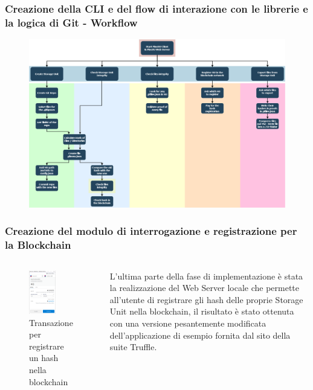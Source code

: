 \documentclass{beamer}
\begin{document}
\begin{frame}
	\frametitle{Creazione della CLI e del flow di interazione con le librerie e la logica di Git - Workflow}
	\begin{figure}
		\includegraphics[width=1\textwidth]{figures/workflow.png}
	\end{figure}
\end{frame}
\begin{frame}
	\frametitle{Creazione del modulo di interrogazione e registrazione per la Blockchain}
	\begin{columns}
		\begin{figure}
			\includegraphics[width=0.6\textwidth]{figures/meta-gui.png}
			\caption{Transazione per registrare un hash nella blockchain}
		\end{figure}
		L’ultima parte della fase di implementazione è stata la realizzazione del Web Server locale che permette all’utente di registrare gli hash delle proprie Storage Unit nella blockchain, il risultato è stato ottenuta con una versione pesantemente modificata dell’applicazione di esempio fornita dal sito della suite Truffle.
	\end{columns}
\end{frame}
\end{document}
